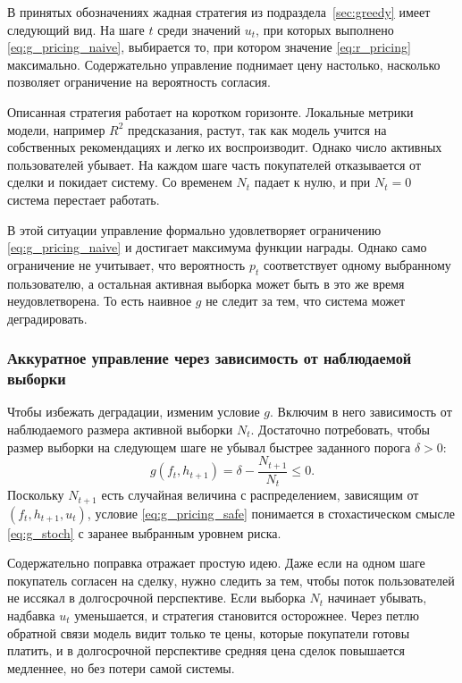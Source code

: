 \documentclass[a4paper,14pt,oneside,openany]{extarticle}
\begin{document}
В принятых обозначениях жадная стратегия из подраздела~\ref{sec:greedy} имеет следующий вид. На шаге $t$ среди значений $u_t$, при которых выполнено \eqref{eq:g_pricing_naive}, выбирается то, при котором значение \eqref{eq:r_pricing} максимально. Содержательно управление поднимает цену настолько, насколько позволяет ограничение на вероятность согласия.

Описанная стратегия работает на коротком горизонте. Локальные метрики модели, например $R^2$ предсказания, растут, так как модель учится на собственных рекомендациях и легко их воспроизводит. Однако число активных пользователей убывает. На каждом шаге часть покупателей отказывается от сделки и покидает систему. Со временем $N_t$ падает к нулю, и при $N_t = 0$ система перестает работать.

В этой ситуации управление формально удовлетворяет ограничению \eqref{eq:g_pricing_naive} и достигает максимума функции награды. Однако само ограничение не учитывает, что вероятность $p_t$ соответствует одному выбранному пользователю, а остальная активная выборка может быть в это же время неудовлетворена. То есть наивное $g$ не следит за тем, что система может деградировать.

\subsubsection{Аккуратное управление через зависимость от наблюдаемой выборки}

Чтобы избежать деградации, изменим условие $g$. Включим в него зависимость от наблюдаемого размера активной выборки $N_t$. Достаточно потребовать, чтобы размер выборки на следующем шаге не убывал быстрее заданного порога $\delta > 0$:
\begin{equation}
    g(f_t, h_{t+1}) = \delta - \frac{N_{t+1}}{N_t} \le 0. \label{eq:g_pricing_safe}
\end{equation}
Поскольку $N_{t+1}$ есть случайная величина с распределением, зависящим от $(f_t, h_{t+1}, u_t)$, условие \eqref{eq:g_pricing_safe} понимается в стохастическом смысле \eqref{eq:g_stoch} с заранее выбранным уровнем риска.

Содержательно поправка отражает простую идею. Даже если на одном шаге покупатель согласен на сделку, нужно следить за тем, чтобы поток пользователей не иссякал в долгосрочной перспективе. Если выборка $N_t$ начинает убывать, надбавка $u_t$ уменьшается, и стратегия становится осторожнее. Через петлю обратной связи модель видит только те цены, которые покупатели готовы платить, и в долгосрочной перспективе средняя цена сделок повышается медленнее, но без потери самой системы.
\end{document}
